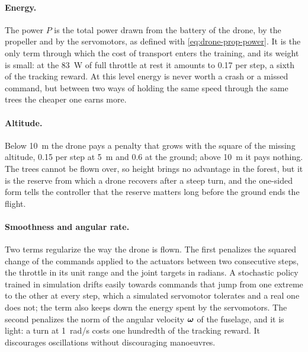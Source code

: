 \paragraph{Energy.} The power $P$ is the total power drawn from the battery of the drone, by the propeller and by the servomotors, as defined with \eqref{eq:drone-prop-power}. It is the only term through which the cost of transport enters the training, and its weight is small: at the 83~W of full throttle at rest it amounts to 0.17 per step, a sixth of the tracking reward. At this level energy is never worth a crash or a missed command, but between two ways of holding the same speed through the same trees the cheaper one earns more.

\paragraph{Altitude.} Below 10~m the drone pays a penalty that grows with the square of the missing altitude, 0.15 per step at 5~m and 0.6 at the ground; above 10~m it pays nothing. The trees cannot be flown over, so height brings no advantage in the forest, but it is the reserve from which a drone recovers after a steep turn, and the one-sided form tells the controller that the reserve matters long before the ground ends the flight.

\paragraph{Smoothness and angular rate.} Two terms regularize the way the drone is flown. The first penalizes the squared change of the commands applied to the actuators between two consecutive steps, the throttle in its unit range and the joint targets in radians. A stochastic policy trained in simulation drifts easily towards commands that jump from one extreme to the other at every step, which a simulated servomotor tolerates and a real one does not; the term also keeps down the energy spent by the servomotors. The second penalizes the norm of the angular velocity $\bm{\omega}$ of the fuselage, and it is light: a turn at 1~rad/s costs one hundredth of the tracking reward. It discourages oscillations without discouraging manoeuvres.

